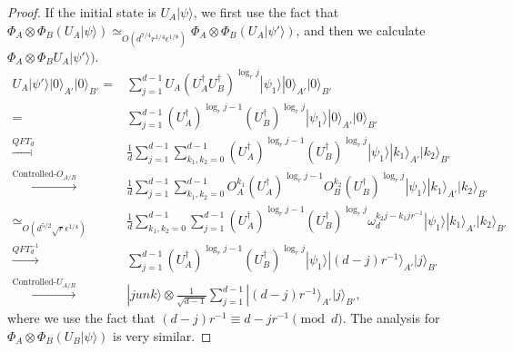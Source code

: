 \documentclass[11pt,letterpaper]{article}
\newcommand{\ket}[1]{|#1\rangle}
\newcommand{\x}{\otimes}
\newcommand{\ct}{^{\dagger}}
\DeclareMathOperator{\spn}{span}
\DeclareMathOperator{\supp}{supp}
\newcommand{\1}{\mathbb{1}}
\newcommand{\ep}{\epsilon}
\newcommand{\qe}{\epsilon^{1/4}}
\newcommand{\sr}{\sqrt{r}}
\newcommand{\appd}[1]{\simeq_{#1}}
\theoremstyle{definition}
\begin{document}
\begin{proof}
If the initial state is $U_A\ket{\psi}$, we first use the fact that 
$ \Phi_A \x \Phi_B (U_A\ket{\psi}) \appd{O(d^{7/4} r^{1/4} \ep^{1/8})}  \Phi_A \x \Phi_B (U_A\ket{\psi'})$, 
and then we calculate $\Phi_A \x \Phi_B U_A\ket{\psi'})$.
\begin{align}
	U_A \ket{\psi'} \ket{0}_{A'}\ket{0}_{B'} =&  
		\sum_{j=1}^{d-1} U_A(U_A\ct U_B\ct)^{\log_r j}\ket{\psi_1} \ket{0}_{A'}\ket{0}_{B'}\\
		=&\sum_{j=1}^{d-1}(U_A\ct)^{\log_r j-1}  (U_B\ct)^{\log_r j} \ket{\psi_1} \ket{0}_{A'}\ket{0}_{B'}\\
		\xrightarrow[]{QFT_d} &\frac{1}{d}\sum_{j=1}^{d-1} \sum_{k_1,k_2 = 0}^{d-1}(U_A\ct)^{\log_r j-1} (U_B\ct)^{\log_r j} \ket{\psi_1}  \ket{k_1}_{A'}\ket{k_2}_{B'}\\
		\xrightarrow[]{\text{Controlled-}O_{A/B}}&\frac{1}{d}\sum_{j=1}^{d-1}\sum_{k_1,k_2 = 0}^{d-1} 
		 O_A^{k_1}(U_A\ct)^{\log_r j-1} O_B^{k_2}(U_B\ct)^{\log_r j} \ket{\psi_1} \ket{k_1}_{A'}\ket{k_2}_{B'}\\
		\appd{O(d^{5/2} \sr \qe)}& \frac{1}{d}\sum_{k_1,k_2 = 0}^{d-1} \sum_{j=1}^{d-1} (U_A\ct)^{\log_r j-1} (U_B\ct)^{\log_r j}
		\omega_d^{k_2j-k_1jr^{-1}}\ket{\psi_1}
		 \ket{k_1}_{A'}\ket{k_2}_{B'}\\
		\xrightarrow[]{QFT_d^{-1}}& \sum_{j=1}^{d-1}  (U_A\ct)^{\log_r j-1} (U_B\ct)^{\log_r j}  
		\ket{\psi_1} \ket{(d-j)r^{-1}}_{A'}\ket{j}_{B'}\\
		\xrightarrow[]{\text{Controlled-}U_{A/B}}& \ket{junk} \x  
		\frac{1}{\sqrt{d-1}} \sum_{j=1}^{d-1} \ket{(d-j)r^{-1}}_{A'}\ket{j}_{B'},
\end{align}
where we use the fact that $(d-j)r^{-1} \equiv d -jr^{-1} \pmod{d}$.
The analysis for $\Phi_A\x\Phi_B(U_B \ket{\psi})$ is very similar.
\end{proof}
\end{document}
